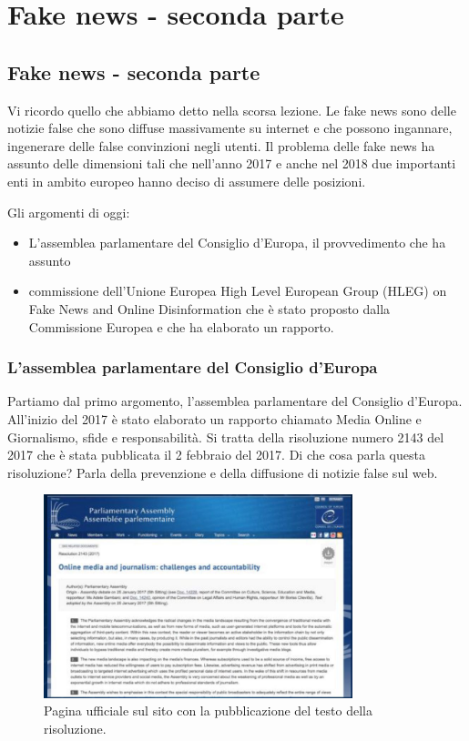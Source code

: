 \chapter{Fake news - seconda parte}

\section{Fake news - seconda parte}

Vi ricordo quello che abbiamo detto nella scorsa lezione. Le fake news sono delle notizie false che sono diffuse massivamente su internet e che possono ingannare, ingenerare delle false convinzioni negli utenti. Il problema delle fake news ha assunto delle dimensioni tali che nell'anno 2017 e anche nel 2018 due importanti enti in ambito europeo hanno deciso di assumere delle posizioni. 

Gli argomenti di oggi:

\begin{itemize}
    \item L'assemblea parlamentare del Consiglio d'Europa, il provvedimento che ha assunto
    \item commissione dell'Unione Europea High Level European Group (HLEG) on Fake News and Online Disinformation che è stato proposto dalla Commissione Europea e che ha elaborato un rapporto.
\end{itemize}

\subsection{L'assemblea parlamentare del Consiglio d'Europa}
Partiamo dal primo argomento, l'assemblea parlamentare del Consiglio d'Europa.
All'inizio del 2017 è stato elaborato un rapporto chiamato Media Online e Giornalismo, sfide e responsabilità. Si tratta della risoluzione numero 2143 del 2017 che è stata pubblicata il 2 febbraio del 2017. 
Di che cosa parla questa risoluzione? 
Parla della prevenzione e della diffusione di notizie false sul web. 

\begin{figure}[ht]
\centering
\includegraphics[width=0.8\textwidth]{images/11_lez_fig_01.jpg}
\caption{Pagina ufficiale sul sito con la pubblicazione del testo della risoluzione.}
\label{fig:11_lez_fig_01}
\end{figure}



